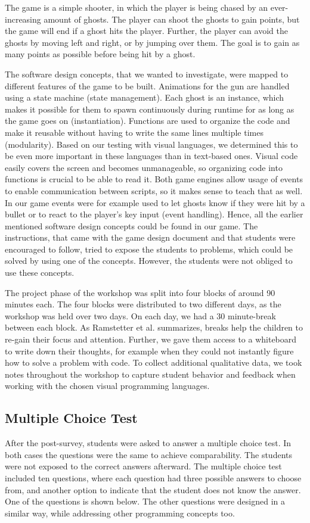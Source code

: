 The game is a simple shooter, in which the player is being chased by an ever-increasing amount of ghosts.
The player can shoot the ghosts to gain points, but the game will end if a ghost hits the player.
Further, the player can avoid the ghosts by moving left and right, or by jumping over them.
The goal is to gain as many points as possible before being hit by a ghost.

The software design concepts, that we wanted to investigate, were mapped to different features of the game to be built.
Animations for the gun are handled using a state machine (state management).
Each ghost is an instance, which makes it possible for them to spawn continuously during runtime for as long as the game goes on (instantiation).
Functions are used to organize the code and make it reusable without having to write the same lines multiple times (modularity).
Based on our testing with visual languages, we determined this to be even more important in these languages than in text-based ones.
Visual code easily covers the screen and becomes unmanageable, so organizing code into functions is crucial to be able to read it.
Both game engines allow usage of events to enable communication between scripts, so it makes sense to teach that as well.
In our game events were for example used to let ghosts know if they were hit by a bullet or to react to the player's key input (event handling).
Hence, all the earlier mentioned software design concepts could be found in our game.
The instructions, that came with the game design document and that students were encouraged to follow, tried to expose the students to problems, which could be solved by using one of the concepts.
However, the students were not obliged to use these concepts.

The project phase of the workshop was split into four blocks of around 90 minutes each.
The four blocks were distributed to two different days, as the workshop was held over two days.
On each day, we had a 30 minute-break between each block.
As Ramstetter et al.\cite{ramstetter_crucial_2010} summarizes, breaks help the children to re-gain their focus and attention.
Further, we gave them access to a whiteboard to write down their thoughts, for example when they could not instantly figure how to solve a problem with code.
To collect additional qualitative data, we took notes throughout the workshop to capture student behavior and feedback when working with the chosen visual programming languages.

\subsection{Multiple Choice Test}\label{subsec:multiple-choice-test}
After the post-survey, students were asked to answer a multiple choice test.
In both cases the questions were the same to achieve comparability.
The students were not exposed to the correct answers afterward.
The multiple choice test included ten questions, where each question had three possible answers to choose from, and another option to indicate that the student does not know the answer.
One of the questions is shown below.
The other questions were designed in a similar way, while addressing other programming concepts too.

